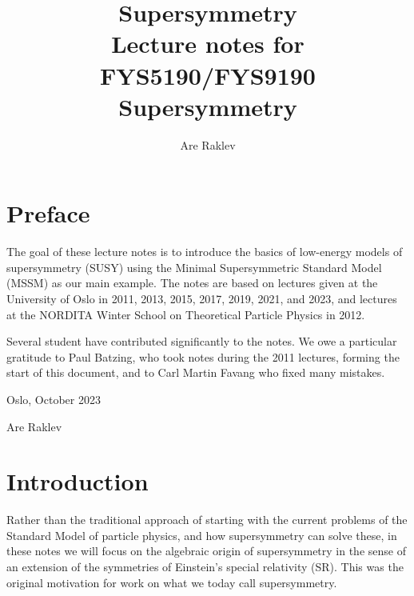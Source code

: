 \documentclass[11pt,a4paper]{book}
\title{{\Huge Supersymmetry} \\ 
\vspace{5mm} Lecture notes for FYS5190/FYS9190 Supersymmetry}
\author{Are Raklev}
\begin{document}

\maketitle


\chapter*{Preface}


The goal of these lecture notes is to introduce the basics of low-energy models of supersymmetry (SUSY) using the Minimal Supersymmetric Standard Model (MSSM) as our main example. The notes are based on lectures given at the University of Oslo in 2011, 2013, 2015, 2017, 2019, 2021, and 2023, and lectures at the NORDITA Winter School on Theoretical Particle Physics in 2012. 

Several student have contributed significantly to the notes. We owe a particular gratitude to Paul Batzing, who took notes during the 2011 lectures, forming the start of this document, and to Carl Martin Favang who fixed many mistakes.


\vspace{5mm}
Oslo, October 2023

Are Raklev





\tableofcontents



\chapter*{Introduction}
Rather than the traditional approach of starting with the current problems of the Standard Model of particle physics, and how supersymmetry can solve these, in these notes we will focus on the algebraic origin of supersymmetry in the sense of an extension of the symmetries of Einstein's special relativity (SR). This was the original motivation for work on what we today call supersymmetry. 
\end{document}
